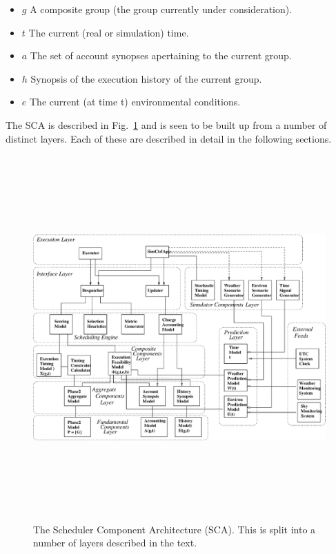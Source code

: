 \begin{itemize}
\item $g$ A composite group (the group currently under consideration).
\item $t$ The current (real or simulation) time.
\item $a$ The set of account synopses apertaining to the current group.
\item $h$ Synopsis of the execution history of the current group.
\item $e$ The current (at time t) environmental conditions.
\end{itemize}

The SCA is described in Fig.~\ref{fig:simframewrk} and is seen to be built up from a number of distinct layers. Each of these are described in detail in the following sections.

\begin{landscape}
   \begin{figure}[htp]
   \begin{center}
   \includegraphics[height=14cm]{figures/sca.eps}
   \end{center}
   \label{fig:simframewrk} 
   \caption[Scheduler Component Architecture.] 
   {The Scheduler Component Architecture (SCA). This is split into a number of layers described in the text.}
   \end{figure} 
\end{landscape}

